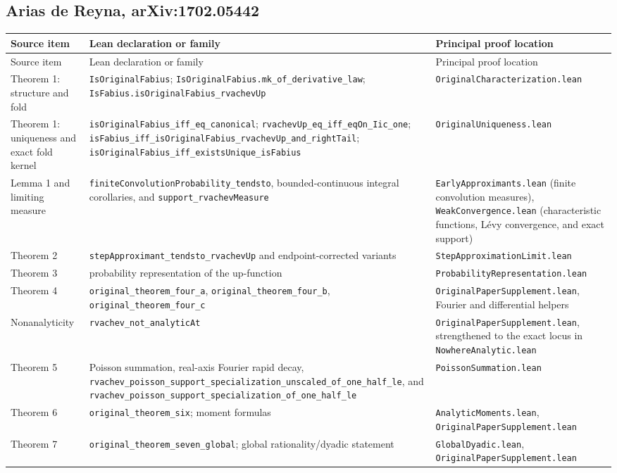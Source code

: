 \documentclass[11pt,oneside]{article}
\theoremstyle{definition}
\theoremstyle{remark}
\begin{document}
\subsection{Arias de Reyna, arXiv:1702.05442}
\begin{longtable}{>{\raggedright\arraybackslash}p{} >{\raggedright\arraybackslash}p{} >{\raggedright\arraybackslash}p{}}
\toprule
Source item & Lean declaration or family & Principal proof location \\
\midrule
\endfirsthead
\toprule
Source item & Lean declaration or family & Principal proof location \\
\midrule
\endhead
Theorem 1: structure and fold & \nolinkurl{IsOriginalFabius}; \nolinkurl{IsOriginalFabius.mk_of_derivative_law}; \nolinkurl{IsFabius.isOriginalFabius_rvachevUp} & \nolinkurl{OriginalCharacterization.lean} \\
Theorem 1: uniqueness and exact fold kernel & \nolinkurl{isOriginalFabius_iff_eq_canonical}; \nolinkurl{rvachevUp_eq_iff_eqOn_Iic_one}; \nolinkurl{isFabius_iff_isOriginalFabius_rvachevUp_and_rightTail}; \nolinkurl{isOriginalFabius_iff_existsUnique_isFabius} & \nolinkurl{OriginalUniqueness.lean} \\
Lemma 1 and limiting measure & \nolinkurl{finiteConvolutionProbability_tendsto}, bounded-continuous integral corollaries, and \nolinkurl{support_rvachevMeasure} & \nolinkurl{EarlyApproximants.lean} (finite convolution measures), \nolinkurl{WeakConvergence.lean} (characteristic functions, Lévy convergence, and exact support) \\
Theorem 2 & \nolinkurl{stepApproximant_tendsto_rvachevUp} and endpoint-corrected variants & \nolinkurl{StepApproximationLimit.lean} \\
Theorem 3 & probability representation of the up-function & \nolinkurl{ProbabilityRepresentation.lean} \\
Theorem 4 & \nolinkurl{original_theorem_four_a}, \nolinkurl{original_theorem_four_b}, \nolinkurl{original_theorem_four_c} & \nolinkurl{OriginalPaperSupplement.lean}, Fourier and differential helpers \\
Nonanalyticity & \nolinkurl{rvachev_not_analyticAt} & \nolinkurl{OriginalPaperSupplement.lean}, strengthened to the exact locus in \nolinkurl{NowhereAnalytic.lean} \\
Theorem 5 & Poisson summation, real-axis Fourier rapid decay, \nolinkurl{rvachev_poisson_support_specialization_unscaled_of_one_half_le}, and \nolinkurl{rvachev_poisson_support_specialization_of_one_half_le} & \nolinkurl{PoissonSummation.lean} \\
Theorem 6 & \nolinkurl{original_theorem_six}; moment formulas & \nolinkurl{AnalyticMoments.lean}, \nolinkurl{OriginalPaperSupplement.lean} \\
Theorem 7 & \nolinkurl{original_theorem_seven_global}; global rationality/dyadic statement & \nolinkurl{GlobalDyadic.lean}, \nolinkurl{OriginalPaperSupplement.lean} \\
\bottomrule
\end{longtable}
\end{document}
